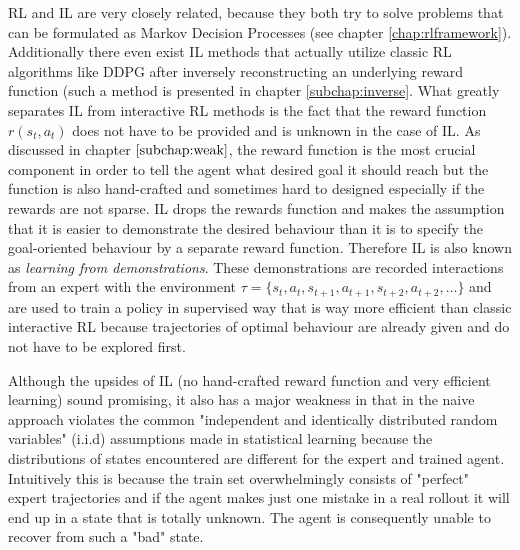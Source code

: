 \par
RL and IL are very closely related, because they both try to solve problems that can be formulated as Markov Decision Processes (see chapter \ref{chap:rlframework}). Additionally there even exist IL methods that actually utilize classic RL algorithms like DDPG after inversely reconstructing an underlying reward function (such a method is presented in chapter \ref{subchap:inverse}. What greatly separates IL from interactive RL methods is the fact that the reward function $r(s_t, a_t)$ does not have to be provided and is unknown in the case of IL. As discussed in chapter $\ref{subchap:weak}$, the reward function is the most crucial component in order to tell the agent what desired goal it should reach but the function is also hand-crafted and sometimes hard to designed especially if the rewards are not sparse. IL drops the rewards function and makes the assumption that it is easier to demonstrate the desired behaviour than it is to specify the goal-oriented behaviour by a separate reward function. Therefore IL is also known as \textit{learning from demonstrations}. These demonstrations are recorded interactions from an expert with the environment $\tau = \{s_t, a_t, s_{t+1}, a_{t+1}, s_{t+2}, a_{t+2}, \dots\}$ and are used to train a policy in supervised way that is way more efficient than classic interactive RL because trajectories of optimal behaviour are already given and do not have to be explored first.
\par
Although the upsides of IL (no hand-crafted reward function and very efficient learning) sound promising, it also has a major weakness in that in the naive approach violates the common "independent and identically distributed random variables" (i.i.d) assumptions made in statistical learning \cite{ross2011reduction} because the distributions of states encountered are different for the expert and trained agent. Intuitively this is because the train set overwhelmingly consists of "perfect" expert trajectories and if the agent makes just one mistake in a real rollout it will end up in a state that is totally unknown. The agent is consequently unable to recover from such a "bad" state.


